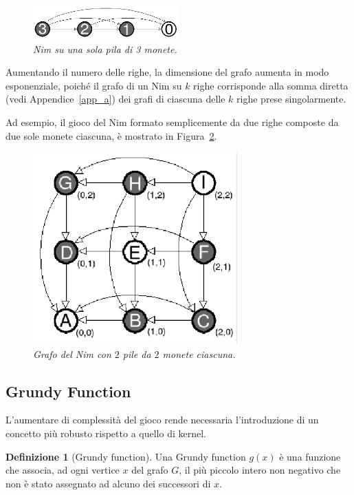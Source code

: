\documentclass[a4paper, 10pt]{report}
\theoremstyle{definition} %
\newtheorem*{definizioneDoc}{Definizione}
\begin{document}
\begin{figure}[h]
    \label{nim_1stack}
    \centerline{
       \includegraphics[width=0.5\textwidth]{figs/nim_1stack.png}  
    }
    \caption{\textsl{Nim su una sola pila di 3 monete.}}
\end{figure}

Aumentando il numero delle righe, la dimensione del grafo aumenta in modo
esponenziale, poich\'e il grafo di un Nim su $k$ righe corrisponde alla
somma diretta (vedi Appendice~\ref{app_a}) dei grafi di ciascuna delle $k$
righe prese singolarmente.  

Ad esempio, il gioco del Nim formato semplicemente da due righe composte da
due sole monete ciascuna, \`e mostrato in Figura~\ref{nim2of2}.

\begin{figure}[h]
  \label{nim2of2}
  \centerline{
       \includegraphics[width=0.7\textwidth]{figs/nim2of2.png}  
  }
  \caption{\textsl{Grafo del Nim con $2$ pile da $2$ monete ciascuna.}}
\end{figure}


\subsection*{Grundy Function}

L'aumentare di complessit\`a del gioco rende necessaria l'introduzione di un
concetto pi\`u robusto rispetto a quello di kernel.
\newline
\begin{definizioneDoc}[Grundy function]  
Una Grundy function $g(x)$ \`e una funzione che associa, ad ogni
vertice $x$ del grafo $G$, il pi\`u piccolo intero non negativo che non
\`e stato assegnato ad alcuno dei successori di $x$.
\end{definizioneDoc}
\end{document}
